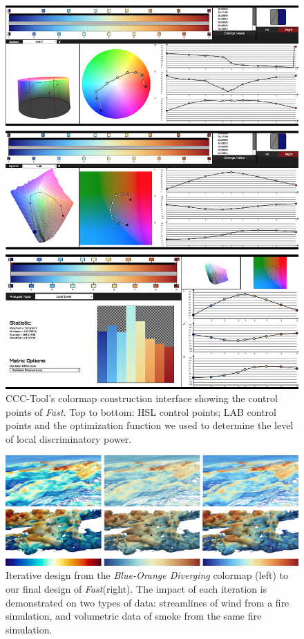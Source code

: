 \documentclass{IEEEcsmag}
\newcommand*{\colormap}[1]{\textsl{#1}\xspace}
\newcommand*{\blueorange}{\colormap{Blue-Orange Diverging}}
\newcommand*{\fast}{\colormap{Fast}}
\begin{document}
\begin{figure}[t]
\includegraphics[width=\columnwidth]{30F_combo}
\centering
\caption{CCC-Tool's colormap construction interface showing the control points of \fast. Top to bottom: HSL control points; LAB control points and the optimization function we used to determine the level of local discriminatory power.}
\label{CCC1}
\end{figure}

\begin{figure}[t]
  \centering
  \includegraphics[width=\textwidth]{Compare22}
  \caption{
    Iterative design from the \blueorange colormap (left) to our final design of \fast (right).
    The impact of each iteration is demonstrated on two types of data: streamlines of wind from a fire simulation, and volumetric data of smoke from the same fire simulation.}
\label{fig:iterations}
\end{figure}
\end{document}
